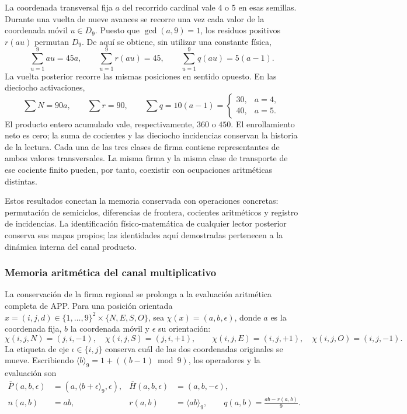 La coordenada transversal fija $a$ del recorrido cardinal vale $4$ o
$5$ en esas semillas. Durante una vuelta de nueve avances se recorre
una vez cada valor de la coordenada móvil $u\in D_9$. Puesto que
$\gcd(a,9)=1$, los residuos positivos $r(au)$ permutan $D_9$.
De aquí se obtiene, sin utilizar una constante física,
\[
 \sum_{u=1}^9au=45a,\qquad
 \sum_{u=1}^9r(au)=45,\qquad
 \sum_{u=1}^9q(au)=5(a-1).
\]
La vuelta posterior recorre las mismas posiciones en sentido opuesto.
En las dieciocho activaciones,
\begin{equation}
 \sum N=90a,\qquad\sum r=90,\qquad
 \sum q=10(a-1)=
 \begin{cases}30,&a=4,\\40,&a=5.\end{cases}
 \label{ii:bim09:ocupacion-30-40}
\end{equation}
El producto entero acumulado vale, respectivamente, $360$ o $450$.
El enrollamiento neto es cero; la suma de cocientes y las dieciocho
incidencias conservan la historia de la lectura. Cada una de las tres
clases de firma contiene representantes de ambos valores transversales.
La misma firma y la misma clase de transporte de ese cociente finito
pueden, por tanto, coexistir con ocupaciones aritméticas distintas.

Estos resultados conectan la memoria conservada con operaciones
concretas: permutación de semiciclos, diferencias de frontera,
cocientes aritméticos y registro de incidencias. La identificación
físico-matemática de cualquier lector posterior conserva sus mapas
propios; las identidades aquí demostradas pertenecen a la dinámica
interna del canal producto.



\subsubsection{Memoria aritmética del canal multiplicativo}
\label{ii:prd-arit:seccion}

La conservación de la firma regional se prolonga a la evaluación
aritmética completa de APP. Para una posición orientada
\(x=(i,j,d)\in\{1,\ldots,9\}^2\times\{N,E,S,O\}\), sea
\(\chi(x)=(a,b,\epsilon)\), donde \(a\) es la coordenada fija,
\(b\) la coordenada móvil y \(\epsilon\) su orientación:
\[
 \chi(i,j,N)=(j,i,-1),\quad \chi(i,j,S)=(j,i,+1),\qquad
 \chi(i,j,E)=(i,j,+1),\quad \chi(i,j,O)=(i,j,-1).
\]
La etiqueta de eje \(\iota\in\{i,j\}\) conserva cuál de las
dos coordenadas originales se mueve. Escribiendo
\(\langle b\rangle_9=1+((b-1)\bmod9)\), los operadores y la
evaluación son
\begin{align}
 \overline P(a,b,\epsilon)&=(a,\langle b+\epsilon\rangle_9,\epsilon),
 &\overline H(a,b,\epsilon)&=(a,b,-\epsilon),\label{ii:prd-arit:PH}\\
 n(a,b)&=ab,&r(a,b)&=\langle ab\rangle_9,\qquad
 q(a,b)=\frac{ab-r(a,b)}9.\label{ii:prd-arit:rq}
\end{align}

